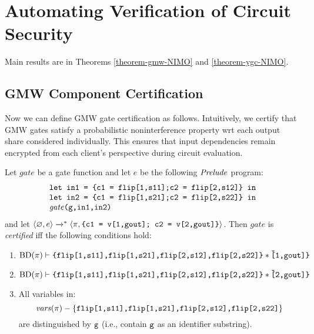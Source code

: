 \section{Automating Verification of Circuit Security}
\label{section-composition}

Main results are in Theorems \ref{theorem-gmw-NIMO} and
\ref{theorem-ygc-NIMO}.

\subsection{GMW Component Certification}

Now we can define GMW gate certification as follows. Intuitively, we certify
that GMW gates satisfy a probabilistic noninterference property wrt each output
share considered individually. This ensures that input dependencies remain
encrypted from each client's perspective during circuit evaluation.
\begin{definition}
  \label{definition-gmwgate-certification}
  Let $\mathit{gate}$ be a gate function and let $e$ be the following
  $\mathit{Prelude}$ program:
  $$
  \begin{array}{l}
    \texttt{let in1 = \{c1 = flip[1,s11];c2 = flip[2,s12]\} in}\\
    \texttt{let in2 = \{c1 = flip[1,s21];c2 = flip[2,s22]\} in}\\
    \mathit{gate}\texttt{(g,in1,in2)}
  \end{array}
  $$
  and let $
  \langle \varnothing,e \rangle\xrightarrow{}^{*}\langle \pi,\texttt{\{c1 = v[1,gout]; c2 = v[2,gout]\}} \rangle
  $.
  Then $\mathit{gate}$ is \emph{certified} iff the following conditions hold:
  \begin{enumerate}[\hspace{5mm}i.]
  \item $\sep{\progtt(\prog)}{\ttt{\{flip[1,s11],flip[1,s21],flip[2,s12],flip[2,s22]\}}}{\ttt{\v[1,gout]\}}}$
  \item $\sep{\progtt(\prog)}{\ttt{\{flip[1,s11],flip[1,s21],flip[2,s12],flip[2,s22]\}}}{\ttt{\v[2,gout]\}}}$
  \item All variables in:$$\mathit{vars}(\pi) - \{ \texttt{flip[1,s11],flip[1,s21],flip[2,s12],flip[2,s22]}\}$$
    are distinguished by $\texttt{g}$ (i.e., contain $\texttt{g}$ as an identifier substring). 
  \end{enumerate}
\end{definition}

